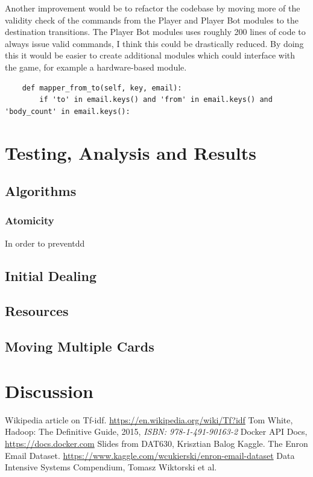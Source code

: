 \documentclass[runningheads,a4paper]{llncs}
\begin{document}
Another improvement would be to refactor the codebase by moving more of the validity check of the commands from the Player and Player Bot modules to the destination transitions. The Player Bot modules uses roughly 200 lines of code to always issue valid commands, I think this could be drastically reduced. By doing this it would be easier to create additional modules which could interface with the game, for example a hardware-based module.

\begin{verbatim}
    def mapper_from_to(self, key, email):
        if 'to' in email.keys() and 'from' in email.keys() and 'body_count' in email.keys():
\end{verbatim}

\section{Testing, Analysis and Results}
\label{sec:3_testing_analysis}
\subsection{Algorithms}
\subsubsection{Atomicity}
In order to preventdd
\subsection{Initial Dealing}
\subsection{Resources}
\subsection{Moving Multiple Cards}

\section{Discussion}



\begin{thebibliography}{6}

 Wikipedia article on Tf-idf. \url{https://en.wikipedia.org/wiki/Tf?idf}
 Tom White, Hadoop: The Definitive Guide, 2015, \emph{ISBN: 978-1-491-90163-2}
 Docker API Docs, \url{https://docs.docker.com}
 Slides from DAT630, Krisztian Balog
 Kaggle. The Enron Email Dataset. \url{https://www.kaggle.com/wcukierski/enron-email-dataset}
 Data Intensive Systems Compendium, Tomasz Wiktorski et al.

\end{thebibliography}
\end{document}
